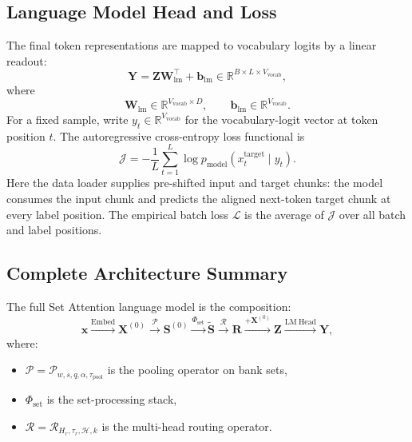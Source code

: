 \documentclass{article}
\theoremstyle{plain}
\theoremstyle{definition}
\theoremstyle{remark}
\begin{document}
\subsection{Language Model Head and Loss}
\label{sec:lm-head}

The final token representations are mapped to vocabulary logits by a linear readout:
\begin{equation}
\label{eq:output-logits}
\mathbf Y=\mathbf Z\mathbf W_{\mathrm{lm}}^\top+\mathbf b_{\mathrm{lm}}
\in\mathbb R^{B\times L\times V_{\mathrm{vocab}}},
\end{equation}
where
\begin{equation}
\mathbf W_{\mathrm{lm}}\in\mathbb R^{V_{\mathrm{vocab}}\times D},
\qquad
\mathbf b_{\mathrm{lm}}\in\mathbb R^{V_{\mathrm{vocab}}}.
\end{equation}
For a fixed sample, write $y_t\in\mathbb R^{V_{\mathrm{vocab}}}$ for the vocabulary-logit vector at token position $t$. The autoregressive cross-entropy loss functional is
\begin{equation}
\label{eq:cross-entropy}
\mathcal J
=
-\frac{1}{L}\sum_{t=1}^{L}
\log p_{\mathrm{model}}(x^{\mathrm{target}}_t\mid y_t).
\end{equation}
Here the data loader supplies pre-shifted input and target chunks: the model consumes the input chunk and predicts the aligned next-token target chunk at every label position. The empirical batch loss $\mathcal L$ is the average of $\mathcal J$ over all batch and label positions.

\subsection{Complete Architecture Summary}
\label{sec:architecture-summary}

The full Set Attention language model is the composition:
\begin{equation}
\label{eq:full-pipeline}
\mathbf x
\xrightarrow{\mathrm{Embed}}
\mathbf X^{(0)}
\xrightarrow{\mathcal P}
\mathbf S^{(0)}
\xrightarrow{\Phi_{\mathrm{set}}}
\widetilde{\mathbf S}
\xrightarrow{\mathcal R}
\mathbf R
\xrightarrow{+\mathbf X^{(0)}}
\mathbf Z
\xrightarrow{\mathrm{LM\ Head}}
\mathbf Y,
\end{equation}
where:
\begin{itemize}
    \item $\mathcal P=\mathcal P_{w,s,q,\alpha,\tau_{\mathrm{pool}}}$ is the pooling operator on bank sets,
    \item $\Phi_{\mathrm{set}}$ is the set-processing stack,
    \item $\mathcal R=\mathcal R_{H_r,\tau_r,\mathcal H,k}$ is the multi-head routing operator.
\end{itemize}
\end{document}
